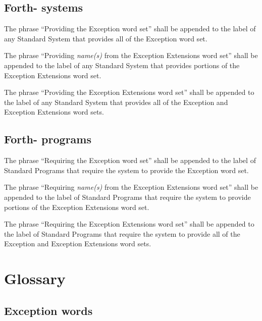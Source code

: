 \subsection{Forth-\snapshot{} systems} %

The phrase ``Providing the Exception word set'' shall be appended to
the label of any Standard System that provides all of the Exception
word set.

The phrase ``Providing \emph{name(s)} from the Exception Extensions
word set'' shall be appended to the label of any Standard System
that provides portions of the Exception Extensions word set.

The phrase ``Providing the Exception Extensions word set'' shall be
appended to the label of any Standard System that provides all of
the Exception and Exception Extensions word sets.

\subsection{Forth-\snapshot{} programs} %

The phrase ``Requiring the Exception word set'' shall be appended
to the label of Standard Programs that require the system to provide
the Exception word set.

The phrase ``Requiring \emph{name(s)} from the Exception Extensions
word set'' shall be appended to the label of Standard Programs that
require the system to provide portions of the Exception Extensions
word set.

The phrase ``Requiring the Exception Extensions word set'' shall be
appended to the label of Standard Programs that require the system
to provide all of the Exception and Exception Extensions word sets.

\newpage
\section{Glossary} %

\subsection{Exception words} %

